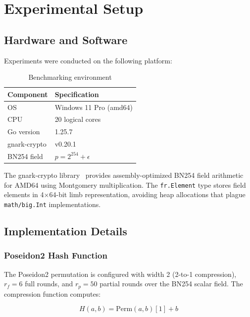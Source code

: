 \section{Experimental Setup}
\label{sec:experimental-setup}

\subsection{Hardware and Software}

Experiments were conducted on the following platform:

\begin{table}[h]
\centering
\caption{Benchmarking environment}
\label{tab:environment}
\begin{tabular}{ll}
\toprule
\textbf{Component} & \textbf{Specification} \\
\midrule
OS & Windows 11 Pro (amd64) \\
CPU & 20 logical cores \\
Go version & 1.25.7 \\
gnark-crypto & v0.20.1 \\
BN254 field & $p = 2^{254} + \epsilon$ \\
\bottomrule
\end{tabular}
\end{table}

The gnark-crypto library~\cite{gnark2024crypto} provides
assembly-optimized BN254 field arithmetic for AMD64 using
Montgomery multiplication. The \texttt{fr.Element} type stores
field elements in 4$\times$64-bit limb representation, avoiding
heap allocations that plague \texttt{math/big.Int} implementations.

\subsection{Implementation Details}

\subsubsection{Poseidon2 Hash Function}

The Poseidon2 permutation is configured with width 2 (2-to-1
compression), $r_f = 6$ full rounds, and $r_p = 50$ partial rounds
over the BN254 scalar field. The compression function computes:

\begin{equation}
H(a, b) = \text{Perm}(a, b)[1] + b
\label{eq:poseidon2}
\end{equation}

